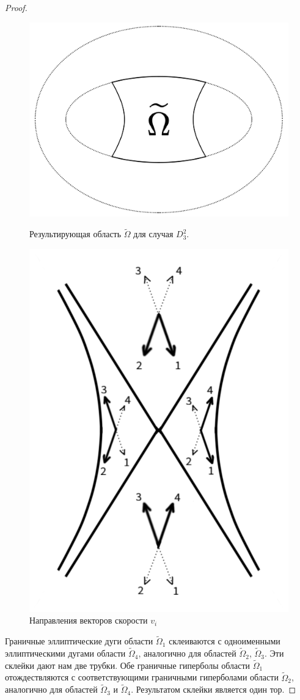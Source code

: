 \begin{proof}
\begin{figure}[!htb]
\centering
\includegraphics[width=0.8\linewidth]{images/ch4/section2/hyp_domain_example.pdf}
    \caption{Результирующая область $\widetilde{\Omega}$ для случая $D_3^2$.}
    \label{fig:pt9:_hyp_domain_example}
\endminipage\hfill
{}
\centering
\includegraphics[width=0.65\linewidth]{images/ch4/section2/hyp_vectors_numbering.pdf}
    \caption{Направления векторов скорости $v_i$}
    \label{fig:pt9:_hyp_vectors_numbering}
\endminipage\hfill
\end{figure}

Граничные эллиптические дуги области $\widetilde{\Omega}_1$ склеиваются с одноименными эллиптическими дугами области $\widetilde{\Omega}_4$, аналогично для областей $\widetilde{\Omega}_2$, $\widetilde{\Omega}_3$.
Эти склейки дают нам две трубки.
Обе граничные гиперболы области $\widetilde{\Omega}_1$ отождествляются с соответствующими граничными гиперболами области $\widetilde{\Omega}_2$, аналогично для областей $\widetilde{\Omega}_3$ и $\widetilde{\Omega}_4$. Результатом склейки является один тор.


\end{proof}
